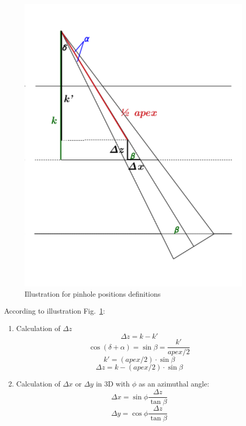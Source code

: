 \documentclass[12pt]{article}
\begin{document}
\begin{figure}[htp]
\centering
\includegraphics[scale=1]{figs/fig_def_positions.pdf}
\caption{Illustration for pinhole positions definitions}
\label{fig:fig_def_positions}
\end{figure}
According to illustration Fig.~\ref{fig:fig_def_positions}: 
\begin{enumerate}
\item Calculation of $\Delta z$
	\begin{equation} 
	\Delta z = k-k'		
	\end{equation}
	\begin{equation} 
	\cos{(\delta+\alpha)} = \sin{\beta} = \frac{k'}{apex/2}	
	\end{equation}
	\begin{equation} 
	k' = (apex/2)\cdot\sin{\beta} 
	\end{equation}
	\begin{equation} 
	\boxed{\Delta z = k - (apex/2)\cdot \sin{\beta} }		
	\end{equation}
\item Calculation of $\Delta x$ or $\Delta y$ in 3D with $\phi$ as an azimuthal angle:
	\begin{equation} 
	\boxed{\Delta x = \sin{\phi}\frac{\Delta z}{\tan{\beta}}}
	\end{equation}
	\begin{equation}	
	\boxed{\Delta y =\cos{\phi} \frac{\Delta z}{\tan{\beta}}}		
	\end{equation}
\end{enumerate}
\clearpage
\end{document}

